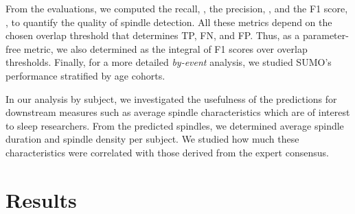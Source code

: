 \documentclass[fleqn,twocolumn,10pt]{wlscirep}
\newcommand{\Fmean}{}
\begin{document}
From the evaluations, we computed the recall,
, the precision,
, and the F1 score,
, to quantify the
quality of spindle detection.
All these metrics depend on the chosen overlap threshold that determines TP, FN,
and FP. Thus, as a parameter-free metric, we also determined \Fmean{} as the
integral of F1 scores over overlap thresholds.
Finally, for a more detailed \emph{by-event} analysis, we studied SUMO's performance stratified by age cohorts.

In our analysis by subject, we investigated the usefulness of the predictions
for downstream measures such as average spindle characteristics which are of
interest to sleep researchers. From the predicted spindles, we determined
average spindle duration and spindle density per subject. We studied how
much these characteristics were correlated with those derived from the expert
consensus.
 
\section{Results}
\label{sec:results}
\end{document}
